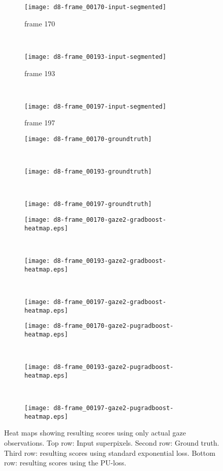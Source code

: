 \begin{figure}[ht]
	\centering
	\begin{subfigure}[h]{0.32\textwidth}
	\texttt{[image: d8-frame\_00170-input-segmented]}	
		\caption*{frame 170}
	\end{subfigure}
	~
	\begin{subfigure}[h]{0.32\textwidth}
	\texttt{[image: d8-frame\_00193-input-segmented]}	
		\caption*{frame 193}
	\end{subfigure}
	~
	\begin{subfigure}[h]{0.32\textwidth}
	\texttt{[image: d8-frame\_00197-input-segmented]}	
		\caption*{frame 197}
	\end{subfigure}

	\vspace{3mm}
	\begin{subfigure}[h]{0.32\textwidth}
	\texttt{[image: d8-frame\_00170-groundtruth]}	
	\end{subfigure}
	~
	\begin{subfigure}[h]{0.32\textwidth}
	\texttt{[image: d8-frame\_00193-groundtruth]}	
	\end{subfigure}
	~
	\begin{subfigure}[h]{0.32\textwidth}
	\texttt{[image: d8-frame\_00197-groundtruth]}	
	\end{subfigure}		
	
	\vspace{3mm}
	\begin{subfigure}[h]{0.32\textwidth}
	\texttt{[image: d8-frame\_00170-gaze2-gradboost-heatmap.eps]}	
	\end{subfigure}
	~
	\begin{subfigure}[h]{0.32\textwidth}
	\texttt{[image: d8-frame\_00193-gaze2-gradboost-heatmap.eps]}
	\end{subfigure}
	~	
	\begin{subfigure}[h]{0.32\textwidth}
	\texttt{[image: d8-frame\_00197-gaze2-gradboost-heatmap.eps]}	
	\end{subfigure}
	
	\vspace{3mm}
	\begin{subfigure}[h]{0.32\textwidth}
	\texttt{[image: d8-frame\_00170-gaze2-pugradboost-heatmap.eps]}	
	\end{subfigure}
	~
	\begin{subfigure}[h]{0.32\textwidth}
	\texttt{[image: d8-frame\_00193-gaze2-pugradboost-heatmap.eps]}	
	\end{subfigure}
	~	
	\begin{subfigure}[h]{0.32\textwidth}
	\texttt{[image: d8-frame\_00197-gaze2-pugradboost-heatmap.eps]}	
	\end{subfigure}	
	
	\caption{Heat maps showing resulting scores using only actual gaze observations. Top row: Input superpixels. Second row: Ground truth. Third row: resulting scores using standard exponential loss. Bottom row: resulting scores using the PU-loss.}
	\label{fig:results-d8-gaze2}
\end{figure}

